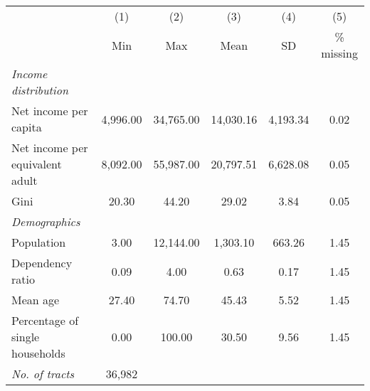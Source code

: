 
\begin{tabular}{@{}lccccc@{}}
\toprule
  & (1) & (2) & (3) &  (4) &  (5) \\
 & Min & Max & Mean & SD & \% missing\\
\midrule
\qquad \textit{Income distribution} \\
Net income per capita &  4,996.00 & 34,765.00 & 14,030.16 &  4,193.34 &      0.02\\
Net income per equivalent adult &  8,092.00 & 55,987.00 & 20,797.51 &  6,628.08 &      0.05\\
Gini &     20.30 &     44.20 &     29.02 &      3.84 &      0.05\\
\qquad \textit{Demographics} \\
Population &      3.00 & 12,144.00 &  1,303.10 &    663.26 &      1.45\\
Dependency ratio &      0.09 &      4.00 &      0.63 &      0.17 &      1.45\\
Mean age &     27.40 &     74.70 &     45.43 &      5.52 &      1.45\\
Percentage of single households &      0.00 &    100.00 &     30.50 &      9.56 &      1.45\\
\textit{No. of tracts} &          36,982 \\
\midrule
\end{tabular}